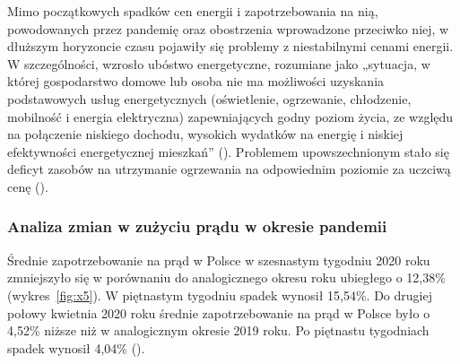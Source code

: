 \documentclass[polish, twoside, 12pt, a4paper]{article}
\theoremstyle{definition}
\theoremstyle{plain}
\theoremstyle{remark}
\begin{document}
Mimo początkowych spadków cen energii i zapotrzebowania na nią, powodowanych przez pandemię oraz obostrzenia wprowadzone przeciwko niej, w dłuższym horyzoncie czasu pojawiły się problemy z niestabilnymi cenami energii. W szczególności, wzrosło ubóstwo  energetyczne, rozumiane jako „sytuacja, w której gospodarstwo domowe lub osoba nie ma możliwości uzyskania podstawowych usług energetycznych (oświetlenie, ogrzewanie, chłodzenie, mobilność i energia elektryczna) zapewniających godny poziom życia, ze względu na połączenie niskiego dochodu, wysokich wydatków na energię i niskiej efektywności energetycznej  mieszkań” (\cite{gorska2023}). Problemem upowszechnionym stało się deficyt zasobów na utrzymanie ogrzewania na odpowiednim poziomie za uczciwą cenę (\cite{gorska2023}). 


\subsubsection{Analiza zmian w zużyciu prądu w okresie pandemii}

Średnie zapotrzebowanie na prąd w Polsce w szesnastym tygodniu 2020 roku zmniejszyło się w porównaniu do analogicznego okresu roku ubiegłego o 12,38\% (wykres~\ref{fig:x5}). W piętnastym tygodniu spadek wynosił 15,54\%. Do drugiej połowy kwietnia 2020 roku średnie zapotrzebowanie na prąd w Polsce było o 4,52\% niższe niż w analogicznym okresie 2019 roku. Po piętnastu tygodniach spadek wynosił 4,04\% (\cite{biuroanalizpfr2020}).
\end{document}

